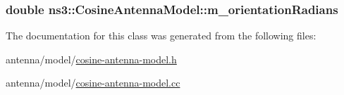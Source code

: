 \subsubsection[{\texorpdfstring{m\+\_\+orientation\+Radians}{m_orientationRadians}}]{\setlength{\rightskip}{0pt plus 5cm}double ns3\+::\+Cosine\+Antenna\+Model\+::m\+\_\+orientation\+Radians\hspace{0.3cm}{\ttfamily [private]}}\hypertarget{classns3_1_1CosineAntennaModel_aed8f9eb9644235e857842250f8387f6e}{}\label{classns3_1_1CosineAntennaModel_aed8f9eb9644235e857842250f8387f6e}


The documentation for this class was generated from the following files\+:\begin{DoxyCompactItemize}
\item 
antenna/model/\hyperlink{cosine-antenna-model_8h}{cosine-\/antenna-\/model.\+h}\item 
antenna/model/\hyperlink{cosine-antenna-model_8cc}{cosine-\/antenna-\/model.\+cc}\end{DoxyCompactItemize}
